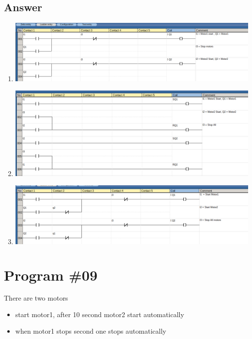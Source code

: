 \documentclass[
	12pt, %
]{fphw}
\begin{document}
 \subsection*{Answer}
 \begin{enumerate}
   \item
  \begin{center}
   \includegraphics[width=150mm, scale=0.80]{prg8.png}
  \end{center}
   \item
   \begin{center}
    \includegraphics[width=150mm, scale=0.80]{prg9.png}
   \end{center}
  \item
    \begin{center}
     \includegraphics[width=150mm, scale=0.80]{prg10.png}
   \end{center}
 \end{enumerate}
 
\section*{Program \#09}
    \begin{problem}
      There are two motors
      \medskip
      \begin{itemize}
      \item start motor1, after 10 second motor2 start automatically
      \item when motor1 stops second one stops automatically
      \end{itemize}
    \end{problem}
\end{document}
